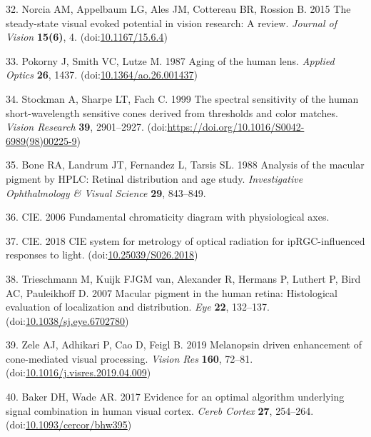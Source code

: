 \documentclass[
]{article}
\begin{document}
\leavevmode\hypertarget{ref-Norcia2015}{}%
32. Norcia AM, Appelbaum LG, Ales JM, Cottereau BR, Rossion B. 2015 The steady-state visual evoked potential in vision research: A review. \emph{Journal of Vision} \textbf{15(6)}, 4. (doi:\href{https://doi.org/10.1167/15.6.4}{10.1167/15.6.4})

\leavevmode\hypertarget{ref-Pokorny1987}{}%
33. Pokorny J, Smith VC, Lutze M. 1987 Aging of the human lens. \emph{Applied Optics} \textbf{26}, 1437. (doi:\href{https://doi.org/10.1364/ao.26.001437}{10.1364/ao.26.001437})

\leavevmode\hypertarget{ref-Stockman1999}{}%
34. Stockman A, Sharpe LT, Fach C. 1999 The spectral sensitivity of the human short-wavelength sensitive cones derived from thresholds and color matches. \emph{Vision Research} \textbf{39}, 2901--2927. (doi:\href{https://doi.org/https://doi.org/10.1016/S0042-6989(98)00225-9}{https://doi.org/10.1016/S0042-6989(98)00225-9})

\leavevmode\hypertarget{ref-Bone1988}{}%
35. Bone RA, Landrum JT, Fernandez L, Tarsis SL. 1988 Analysis of the macular pigment by HPLC: Retinal distribution and age study. \emph{Investigative Ophthalmology \& Visual Science} \textbf{29}, 843--849.

\leavevmode\hypertarget{ref-CIE2006}{}%
36. CIE. 2006 Fundamental chromaticity diagram with physiological axes.

\leavevmode\hypertarget{ref-CIE2018}{}%
37. CIE. 2018 CIE system for metrology of optical radiation for ipRGC-influenced responses to light. (doi:\href{https://doi.org/10.25039/S026.2018}{10.25039/S026.2018})

\leavevmode\hypertarget{ref-Trieschmann2007}{}%
38. Trieschmann M, Kuijk FJGM van, Alexander R, Hermans P, Luthert P, Bird AC, Pauleikhoff D. 2007 Macular pigment in the human retina: Histological evaluation of localization and distribution. \emph{Eye} \textbf{22}, 132--137. (doi:\href{https://doi.org/10.1038/sj.eye.6702780}{10.1038/sj.eye.6702780})

\leavevmode\hypertarget{ref-Zele2019}{}%
39. Zele AJ, Adhikari P, Cao D, Feigl B. 2019 Melanopsin driven enhancement of cone-mediated visual processing. \emph{Vision Res} \textbf{160}, 72--81. (doi:\href{https://doi.org/10.1016/j.visres.2019.04.009}{10.1016/j.visres.2019.04.009})

\leavevmode\hypertarget{ref-Baker2017}{}%
40. Baker DH, Wade AR. 2017 Evidence for an optimal algorithm underlying signal combination in human visual cortex. \emph{Cereb Cortex} \textbf{27}, 254--264. (doi:\href{https://doi.org/10.1093/cercor/bhw395}{10.1093/cercor/bhw395})
\end{document}
